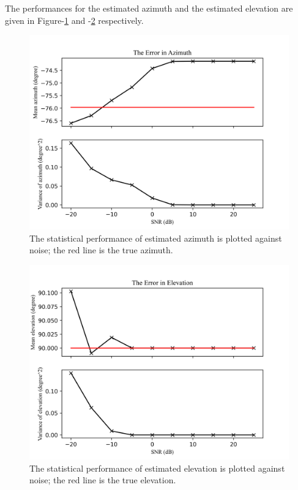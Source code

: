 \documentclass[notitlepage]{report}
\begin{document}
The performances for the estimated azimuth and the estimated elevation are given in Figure-\ref{fig:srp_phat_noise_azimuth} and -\ref{fig:srp_phat_noise_elevation} respectively.

\begin{figure}[H]
\includegraphics[width=1\textwidth]{../Python/srp_phat/noise_azimuth.png}
\centering
\caption{The statistical performance of estimated azimuth is plotted against noise; the red line is the true azimuth.}
\label{fig:srp_phat_noise_azimuth}
\centering
\end{figure}

\begin{figure}[H]
\includegraphics[width=1\textwidth]{../Python/srp_phat/noise_elevation.png}
\centering
\caption{The statistical performance of estimated elevation is plotted against noise; the red line is the true elevation.}
\label{fig:srp_phat_noise_elevation}
\centering
\end{figure}
\end{document}
